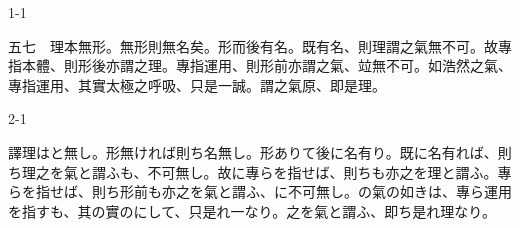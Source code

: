 \documentclass[tate,paper=b6j,jafontsize=9pt]{jlreq}
\begin{document}
\begin{azconvIndented}{1\zw}{-1\zw}

五七　理本無形。無形則無名矣。形而後有名。既有名、則理謂之氣無不可。故專指本體、則形後亦謂之理。專指運用、則形前亦謂之氣、竝無不可。如浩然之氣、專指運用、其實太極之呼吸、只是一誠。謂之氣原、即是理。

\end{azconvIndented}
\begin{azconvIndented}{2\zw}{-1\zw}

譯理はと無し。形無ければ則ち名無し。形ありて後に名有り。既に名有れば、則ち理之を氣と謂ふも、不可無し。故に專らを指せば、則ちも亦之を理と謂ふ。專らを指せば、則ち形前も亦之を氣と謂ふ、に不可無し。の氣の如きは、專ら運用を指すも、其の實のにして、只是れ一なり。之を氣と謂ふ、即ち是れ理なり。

\end{azconvIndented}
\end{document}
